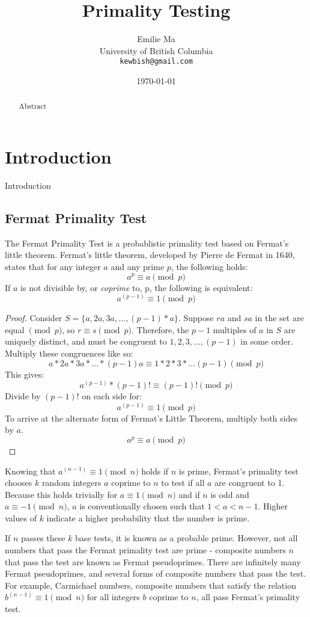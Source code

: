 \documentclass{article}
\title[Primality Testing]{Primality Testing}
\author[Emilie Ma]{%
Emilie Ma\\%
University of British Columbia\\%
\texttt{kewbish@gmail.com}%
}
\date{\today}
\begin{document}
\maketitle
\newpage
\begin{abstract}
    Abstract
\end{abstract}

\section{Introduction}
Introduction

\subsection{Fermat Primality Test}
The Fermat Primality Test is a probablistic primality test based on Fermat's little theorem.
Fermat's little theorem, developed by Pierre de Fermat in 1640, states that for any integer $a$ and any prime $p$, the following holds:
\[
    a^p \equiv a \pmod{p} 
\]
If $a$ is not divisible by, or \emph{coprime} to, p, the following is equivalent:
\[
    a^{(p - 1)} \equiv 1 \pmod{p} 
\]

\begin{proof} %
Consider $S = \{a, 2a, 3a, \ldots{}, (p - 1) * a\}$.
Suppose $ra$ and $sa$ in the set are equal $\pmod{p}$, so $r \equiv s \pmod{p}$.
Therefore, the $p - 1$ multiples of $a$ in $S$ are uniquely distinct, and must be congruent to ${1, 2, 3, \ldots{}, (p - 1)}$ in some order.
Multiply these congruences like so:
    \[a * 2a * 3a * \ldots{} * (p - 1)a \equiv 1 * 2 * 3 * \ldots{} (p - 1) \pmod{p}\]
This gives:
    \[a^{(p - 1)} * (p - 1)! \equiv (p - 1)! \pmod{p}\]
Divide by $(p - 1)!$ on each side for:
    \[a^{(p - 1)} \equiv 1 \pmod{p}\]
To arrive at the alternate form of Fermat's Little Theorem, multiply both sides by $a$.
    \[a^p \equiv a \pmod{p}\]
\end{proof}

Knowing that $a^{(n - 1)} \equiv 1 \pmod{n}$ holds if $n$ is prime, Fermat's primality test chooses $k$ random integers $a$ coprime to $n$ to test if all $a$ are congruent to 1. Because this holds trivially for $a \equiv 1 \pmod{n}$ and if $n$ is odd and $a \equiv -1 \pmod{n}$, $a$ is conventionally chosen such that $1 < a < n - 1$. Higher values of $k$ indicate a higher probability that the number is prime.

If $n$ passes these $k$ base tests, it is known as a probable prime. However, not all numbers that pass the Fermat primality test are prime - composite numbers $n$ that pass the test are known as Fermat pseudoprimes. There are infinitely many Fermat pseudoprimes, and several forms of composite numbers that pass the test. For example, Carmichael numbers, composite numbers that satisfy the relation $b^{(n-1)} \equiv 1 \pmod{n}$ for all integers $b$ coprime to $n$, all pass Fermat's primality test.
\end{document}

